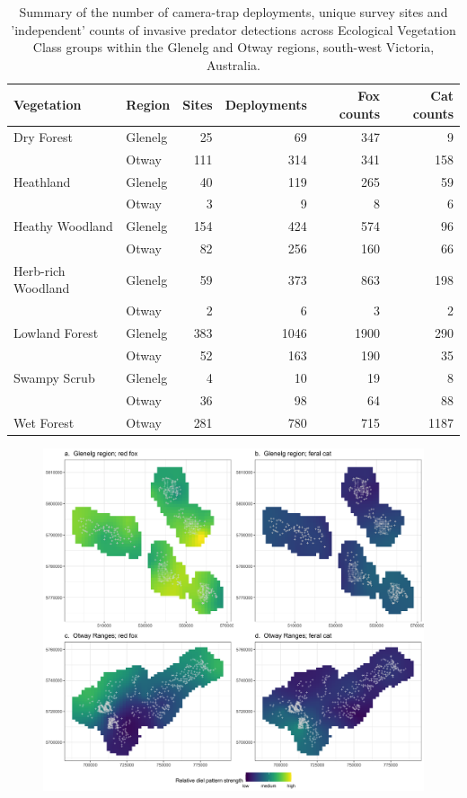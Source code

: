 \documentclass[11pt,a4paper,titlepage,twoside,openright]{style/unimelbthesis}
\begin{document}
\begin{mainmatter}
\begingroup\fontsize{10}{12}\selectfont
\begin{longtable}[t]{llrrrr}
\caption{\label{tab:diel-tab1}Summary of the number of camera-trap deployments, unique survey sites and 'independent' counts of invasive predator detections across Ecological Vegetation Class groups within the Glenelg and Otway regions, south-west Victoria, Australia.}\\
\toprule
Vegetation & Region & Sites & Deployments & Fox counts & Cat counts\\
\midrule
Dry Forest & Glenelg & 25 & 69 & 347 & 9\\
 & Otway & 111 & 314 & 341 & 158\\
Heathland & Glenelg & 40 & 119 & 265 & 59\\
 & Otway & 3 & 9 & 8 & 6\\
Heathy Woodland & Glenelg & 154 & 424 & 574 & 96\\
\addlinespace
 & Otway & 82 & 256 & 160 & 66\\
Herb-rich Woodland & Glenelg & 59 & 373 & 863 & 198\\
 & Otway & 2 & 6 & 3 & 2\\
Lowland Forest & Glenelg & 383 & 1046 & 1900 & 290\\
 & Otway & 52 & 163 & 190 & 35\\
\addlinespace
Swampy Scrub & Glenelg & 4 & 10 & 19 & 8\\
 & Otway & 36 & 98 & 64 & 88\\
Wet Forest & Otway & 281 & 780 & 715 & 1187\\
\bottomrule
\end{longtable}
\endgroup{}

\newpage
\begin{figure}

{\centering \includegraphics[width=1\linewidth]{figure/c4/diel_strength_600dpi} 

}
\end{figure}
\end{mainmatter}
\end{document}
